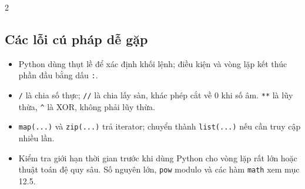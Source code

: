 \begin{multicols}{2}
\subsection{Các lỗi cú pháp dễ gặp}
\begin{itemize}
\setlength{\itemsep}{2pt}
\item Python dùng thụt lề để xác định khối lệnh; điều kiện và
      vòng lặp kết thúc phần đầu bằng dấu \texttt{:}.
\item \texttt{/} là chia số thực; \texttt{//} là chia lấy sàn,
      khác phép cắt về $0$ khi số âm. \texttt{**} là lũy thừa,
      \verb|^| là XOR, không phải lũy thừa.
\item \texttt{map(...)} và \texttt{zip(...)} trả iterator;
      chuyển thành \texttt{list(...)} nếu cần truy cập nhiều lần.
\item Kiểm tra giới hạn thời gian trước khi dùng Python cho vòng lặp
      rất lớn hoặc thuật toán đệ quy sâu. Số nguyên lớn, \texttt{pow}
      modulo và các hàm \texttt{math} xem mục 12.5.
\end{itemize}

\end{multicols}
\endgroup
